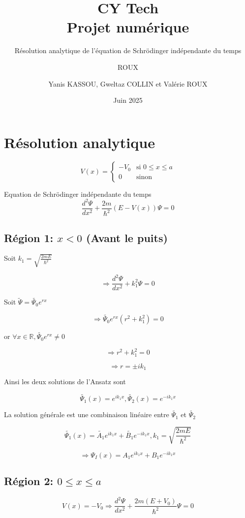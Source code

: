 \documentclass[12pt,a4paper]{article}
\author{ROUX}
\date{Juin 2025}
\title{\textbf{CY Tech
\\{\Large Projet numérique}}}
\subtitle{Résolution analytique de l'équation de Schrödinger indépendante du temps}
\author{Yanis KASSOU, Gweltaz COLLIN et Valérie ROUX}
\begin{document}
\maketitle

\section{Résolution analytique}

\[
V(x) = \begin{cases}
-V_0 & \text{si } 0 \leq x \leq a \\
0 & \text{sinon}
\end{cases}
\]

\noindent Equation de Schrödinger indépendante du temps
\[
\frac{d^2\Psi}{dx^2} + \frac{2m}{\hbar^2}(E-V(x))\Psi = 0
\]

\subsection{Région 1: $x < 0$ (Avant le puits)}



Soit $k_1 = \sqrt{\frac{2mE}{\hbar^2}}$

\[\Rightarrow \frac{d^2\Psi}{dx^2} + k_1^2\Psi = 0\]

Soit $\tilde{\Psi} = \tilde{\Psi_0}e^{rx}$

\[\Rightarrow \tilde{\Psi_0}e^{rx}(r^2 + k_1^2) = 0\]

or $\forall x \in \mathbb{R}, \tilde{\Psi_0}e^{rx} \neq 0$

\[\Rightarrow r^2 + k_1^2 = 0\]

\[\Rightarrow r = \pm ik_1\]

Ainsi les deux solutions de l'Ansatz sont

\[\tilde{\Psi_1}(x) = e^{ik_1x}, \tilde{\Psi_2}(x) = e^{-ik_1x}\]

La solution générale est une combinaison linéaire entre $\tilde{\Psi_1}$ et $\tilde{\Psi_2}$

\[\tilde{\Psi_1}(x) = \tilde{A_1}e^{ik_1x} + \tilde{B_1}e^{-ik_1x}, k_1 = \sqrt{\frac{2mE}{\hbar^2}}\]

\[\Rightarrow \Psi_I(x) = A_1e^{ik_1x} + B_1e^{-ik_1x}\]

\subsection{Région 2: $0 \leq x \leq a$}

\[V(x) = -V_0 \Rightarrow \frac{d^2\Psi}{dx^2} + \frac{2m(E+V_0)}{\hbar^2}\Psi = 0\]
\end{document}
